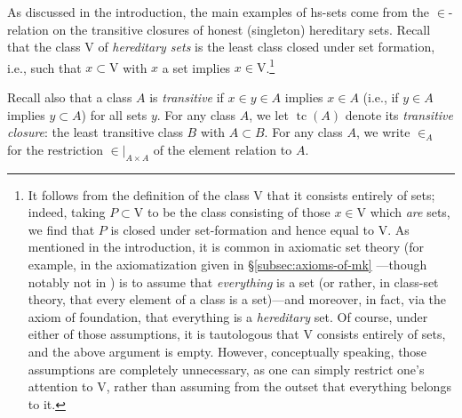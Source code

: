 \documentclass{amsart}
\newcommand\rstr[2]{{\left.#1\right|_{#2}}}
\newcommand\rV{\mathrm{V}}
\newcommand\tc{\operatorname{tc}}
\newcommand\unin{{\in}}
\newcommand\prerefpost[3]{%
  \texorpdfstring%
    {\hyperref[#2]{#1\ref*{#2}#3}}%
    {#1\ref*{#2}#3}%
}
\newcommand\sref[1]{\prerefpost{\S}{#1}{}}
\theoremstyle{definition}
\theoremstyle{remark}
\theoremstyle{plainwithref}
\begin{document}
As discussed in the introduction, the main examples of hs-sets come from the \( \unin \)-relation on the transitive closures of honest (singleton) hereditary sets.
Recall that the class \( \rV \) of \emph{hereditary sets} is the least class closed under set formation, i.e., such that \( x \subset \rV \) with \( x \) a set implies \( x \in \rV \).\footnote{
  It follows from the definition of the class \( \rV \) that it consists entirely of sets; indeed, taking \( P \subset \rV \) to be the class consisting of those \( x \in \rV \) which \emph{are} sets, we find that \( P \) is closed under set-formation and hence equal to \( \rV \).
  As mentioned in the introduction, it is common in axiomatic set theory (for example, in the axiomatization given in \sref{subsec:axioms-of-mk}---though notably not in \cite{zermelo-grundlagen-der-mengenlehre}) is to assume that \emph{everything} is a set (or rather, in class-set theory, that every element of a class is a set)---and moreover, in fact, via the axiom of foundation, that everything is a \emph{hereditary} set.
  Of course, under either of those assumptions, it is tautologous that \( \rV \) consists entirely of sets, and the above argument is empty.
  However, conceptually speaking, those assumptions are completely unnecessary, as one can simply restrict one's attention to \( \rV \), rather than assuming from the outset that everything belongs to it.
}

Recall also that a class \( A \) is \emph{transitive} if \( x \in y \in A \) implies \( x \in A \) (i.e., if \( y \in A \) implies \( y \subset A \)) for all sets \( y \).
For any class \( A \), we let \( \tc(A) \) denote its \emph{transitive closure}: the least transitive class \( B \) with \( A \subset B \).
For any class \( A \), we write \( \unin_A \) for the restriction \( \rstr{\unin}{A \times A} \) of the element relation to \( A \).
\end{document}
